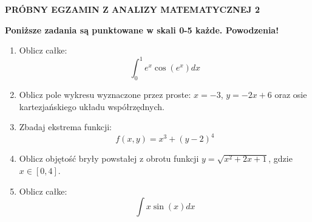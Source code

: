 \documentclass[12pt,a4paper]{article}
\begin{document}
	
\begin{center}
\LARGE
\textbf{PRÓBNY EGZAMIN Z ANALIZY MATEMATYCZNEJ 2}
\end{center}
\textbf{Poniższe zadania są punktowane w skali 0-5 każde. Powodzenia!}
	\begin{enumerate}
		\item Oblicz całke:
		$$\int_{0}^{1} e^x \cos(e^x) dx$$
		\item Oblicz pole wykresu wyznaczone przez proste: $x=-3$, $y=-2x+6$ oraz osie kartezjańskiego układu współrzędnych.
		\item Zbadaj ekstrema funkcji:
		$$f(x,y)=x^3+(y-2)^4$$
		\item Oblicz objętość bryły powstałej z obrotu funkcji $y=\sqrt{x^2+2x+1}$, gdzie $x\in [0,4]$.
		\item Oblicz całke:
		$$\int x\sin(x) dx$$
	\end{enumerate}
\end{document}
